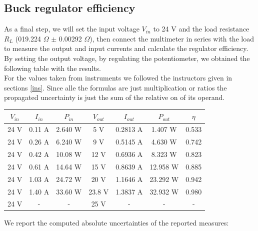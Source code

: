 \documentclass[../main.tex]{subfiles}
\begin{document}
\subsection{Buck regulator efficiency}

As a final step, we will set the input voltage $V_{in}$ to 24 V and the load resistance $R_L$ (019.224 $\Omega$ $\pm$ 0.00292 $\Omega$), then connect the multimeter in series with the load to measure the output and input currents and calculate the regulator efficiency.\\

By setting the output voltage, by regulating the potentiometer, we obtained the following table with the results.\\

For the values taken from instruments we followed the instructors given in sections \ref{ins}. Since alle the formulas are just multiplication or ratios the propagated uncertainty is just the sum of the relative on of its operand.

\begin{center}
\begin{tabular}{c c c c c c c}
$V_{in}$ & $I_{in}$ & $P_{in}$ & $V_{out}$ & $I_{out}$ & $P_{out}$ & $\eta$ \\

\hline
 24 V & 0.11 A & 2.640 W & 5 V & 0.2813 A & 1.407 W & 0.533 \\
\hline
 24 V & 0.26 A & 6.240 W & 9 V &  0.5145 A &  4.630 W & 0.742 \\
\hline 
 24 V & 0.42 A & 10.08 W & 12 V & 0.6936 A & 8.323 W & 0.823 \\
\hline
 24 V & 0.61 A & 14.64 W & 15 V & 0.8639 A & 12.958 W & 0.885 \\
\hline
 24 V & 1.03 A & 24.72 W & 20 V & 1.1646 A & 23.292 W & 0.942 \\
\hline
 24 V & 1.40 A & 33.60 W & 23.8 V & 1.3837 A & 32.932 W & 0.980 \\
\hline
 24 V & - &  - & 25 V & - & - & - \\


\end{tabular}
\end{center}


We report the computed absolute uncertainties of the reported measures:
\end{document}
